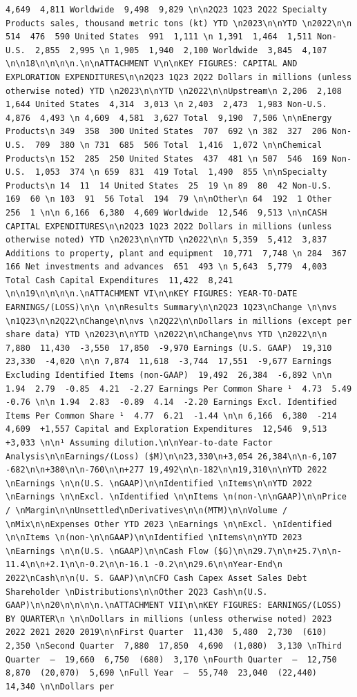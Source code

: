 \documentclass[
  letterpaper,
  DIV=11,
  numbers=noendperiod]{scrreprt}
\begin{document}
\begin{verbatim}
4,649  4,811 Worldwide  9,498  9,829 \n\n2Q23 1Q23 2Q22 Specialty Products sales, thousand metric tons (kt) YTD \n2023\n\nYTD \n2022\n\n 514  476  590 United States  991  1,111 \n 1,391  1,464  1,511 Non-U.S.  2,855  2,995 \n 1,905  1,940  2,100 Worldwide  3,845  4,107 \n\n18\n\n\n\n.\n\nATTACHMENT V\n\nKEY FIGURES: CAPITAL AND EXPLORATION EXPENDITURES\n\n2Q23 1Q23 2Q22 Dollars in millions (unless otherwise noted) YTD \n2023\n\nYTD \n2022\n\nUpstream\n 2,206  2,108  1,644 United States  4,314  3,013 \n 2,403  2,473  1,983 Non-U.S.  4,876  4,493 \n 4,609  4,581  3,627 Total  9,190  7,506 \n\nEnergy Products\n 349  358  300 United States  707  692 \n 382  327  206 Non-U.S.  709  380 \n 731  685  506 Total  1,416  1,072 \n\nChemical Products\n 152  285  250 United States  437  481 \n 507  546  169 Non-U.S.  1,053  374 \n 659  831  419 Total  1,490  855 \n\nSpecialty Products\n 14  11  14 United States  25  19 \n 89  80  42 Non-U.S.  169  60 \n 103  91  56 Total  194  79 \n\nOther\n 64  192  1 Other  256  1 \n\n 6,166  6,380  4,609 Worldwide  12,546  9,513 \n\nCASH CAPITAL EXPENDITURES\n\n2Q23 1Q23 2Q22 Dollars in millions (unless otherwise noted) YTD \n2023\n\nYTD \n2022\n\n 5,359  5,412  3,837 Additions to property, plant and equipment  10,771  7,748 \n 284  367  166 Net investments and advances  651  493 \n 5,643  5,779  4,003 Total Cash Capital Expenditures  11,422  8,241 \n\n19\n\n\n\n.\nATTACHMENT VI\n\nKEY FIGURES: YEAR-TO-DATE EARNINGS/(LOSS)\n\n \n\nResults Summary\n\n2Q23 1Q23\nChange \n\nvs \n1Q23\n\n2Q22\nChange\n\nvs \n2Q22\n\nDollars in millions (except per share data) YTD \n2023\n\nYTD \n2022\n\nChange\nvs YTD \n2022\n\n 7,880  11,430  -3,550  17,850  -9,970 Earnings (U.S. GAAP)  19,310  23,330  -4,020 \n\n 7,874  11,618  -3,744  17,551  -9,677 Earnings Excluding Identified Items (non-GAAP)  19,492  26,384  -6,892 \n\n 1.94  2.79  -0.85  4.21  -2.27 Earnings Per Common Share ¹  4.73  5.49  -0.76 \n\n 1.94  2.83  -0.89  4.14  -2.20 Earnings Excl. Identified Items Per Common Share ¹  4.77  6.21  -1.44 \n\n 6,166  6,380  -214  4,609  +1,557 Capital and Exploration Expenditures  12,546  9,513  +3,033 \n\n¹ Assuming dilution.\n\nYear-to-date Factor Analysis\n\nEarnings/(Loss) ($M)\n\n23,330\n+3,054 26,384\n\n-6,107 -682\n\n+380\n\n-760\n\n+277 19,492\n\n-182\n\n19,310\n\nYTD 2022 \nEarnings \n\n(U.S. \nGAAP)\n\nIdentified \nItems\n\nYTD 2022 \nEarnings \n\nExcl. \nIdentified \n\nItems \n(non-\n\nGAAP)\n\nPrice / \nMargin\n\nUnsettled\nDerivatives\n\n(MTM)\n\nVolume / \nMix\n\nExpenses Other YTD 2023 \nEarnings \n\nExcl. \nIdentified \n\nItems \n(non-\n\nGAAP)\n\nIdentified \nItems\n\nYTD 2023 \nEarnings \n\n(U.S. \nGAAP)\n\nCash Flow ($G)\n\n29.7\n\n+25.7\n\n-11.4\n\n+2.1\n\n-0.2\n\n-16.1 -0.2\n\n29.6\n\nYear-End\n 2022\nCash\n\n(U. S. GAAP)\n\nCFO Cash Capex Asset Sales Debt Shareholder \nDistributions\n\nOther 2Q23 Cash\n(U.S. GAAP)\n\n20\n\n\n\n.\nATTACHMENT VII\n\nKEY FIGURES: EARNINGS/(LOSS) BY QUARTER\n \n\nDollars in millions (unless otherwise noted) 2023 2022 2021 2020 2019\n\nFirst Quarter  11,430  5,480  2,730  (610)  2,350 \nSecond Quarter  7,880  17,850  4,690  (1,080)  3,130 \nThird Quarter  —  19,660  6,750  (680)  3,170 \nFourth Quarter  —  12,750  8,870  (20,070)  5,690 \nFull Year  —  55,740  23,040  (22,440)  14,340 \n\nDollars per 
\end{verbatim}
\end{document}
